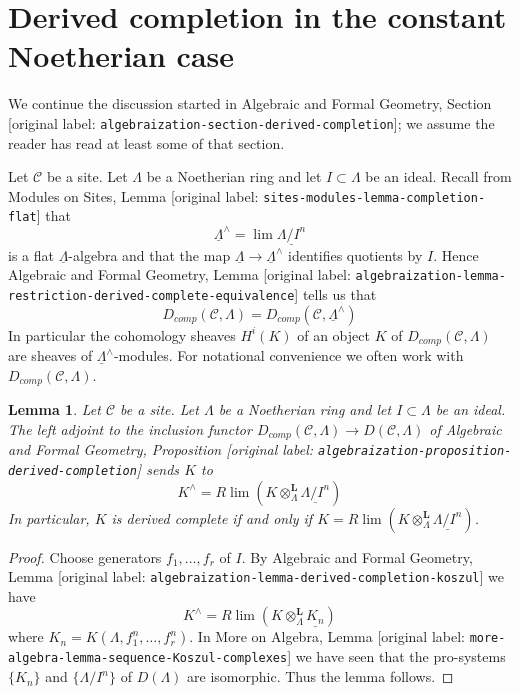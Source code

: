 \documentclass[10pt,a4paper]{article}
\theoremstyle{plain}
\newtheorem{lemma}[subsection]{Lemma}
\theoremstyle{definition}
\theoremstyle{remark}
\numberwithin{equation}{subsection}
\def\lim{\mathop{\mathrm{lim}}\nolimits}
\begin{document}
\section{Derived completion in the constant Noetherian case}
\label{section-derived-completion-noetherian}

\noindent
We continue the discussion started in Algebraic and Formal Geometry, Section
\textnormal{[original label: \nolinkurl{algebraization-section-derived-completion}]};
we assume the reader has read at least some of that section.

\medskip\noindent
Let $\mathcal{C}$ be a site. Let $\Lambda$ be a Noetherian ring
and let $I \subset \Lambda$ be an ideal. Recall from
Modules on Sites, Lemma \textnormal{[original label: \nolinkurl{sites-modules-lemma-completion-flat}]}
that
$$
\underline{\Lambda}^\wedge = \lim \underline{\Lambda/I^n}
$$
is a flat $\underline{\Lambda}$-algebra and that the map
$\underline{\Lambda} \to \underline{\Lambda}^\wedge$ identifies
quotients by $I$. Hence
Algebraic and Formal Geometry, Lemma
\textnormal{[original label: \nolinkurl{algebraization-lemma-restriction-derived-complete-equivalence}]}
tells us that
$$
D_{comp}(\mathcal{C}, \Lambda) =
D_{comp}(\mathcal{C}, \underline{\Lambda}^\wedge)
$$
In particular the cohomology sheaves $H^i(K)$ of an object $K$ of
$D_{comp}(\mathcal{C}, \Lambda)$ are sheaves of
$\underline{\Lambda}^\wedge$-modules.
For notational convenience we often work with
$D_{comp}(\mathcal{C}, \Lambda)$.

\begin{lemma}
\label{lemma-naive-completion}
Let $\mathcal{C}$ be a site. Let $\Lambda$ be a Noetherian ring
and let $I \subset \Lambda$ be an ideal. The left adjoint
to the inclusion functor
$D_{comp}(\mathcal{C}, \Lambda) \to D(\mathcal{C}, \Lambda)$
of Algebraic and Formal Geometry, Proposition
\textnormal{[original label: \nolinkurl{algebraization-proposition-derived-completion}]} sends $K$ to
$$
K^\wedge = R\lim(K \otimes_\Lambda^\mathbf{L} \underline{\Lambda/I^n})
$$
In particular, $K$ is derived complete if and only if
$K = R\lim(K \otimes_\Lambda^\mathbf{L} \underline{\Lambda/I^n})$.
\end{lemma}

\begin{proof}
Choose generators $f_1, \ldots, f_r$ of $I$. By
Algebraic and Formal Geometry, Lemma
\textnormal{[original label: \nolinkurl{algebraization-lemma-derived-completion-koszul}]}
we have
$$
K^\wedge = 
R\lim (K \otimes_\Lambda^\mathbf{L} \underline{K_n})
$$
where $K_n = K(\Lambda, f_1^n, \ldots, f_r^n)$.
In More on Algebra, Lemma \textnormal{[original label: \nolinkurl{more-algebra-lemma-sequence-Koszul-complexes}]}
we have seen that the pro-systems $\{K_n\}$ and
$\{\Lambda/I^n\}$ of $D(\Lambda)$
are isomorphic. Thus the lemma follows.
\end{proof}
\end{document}
